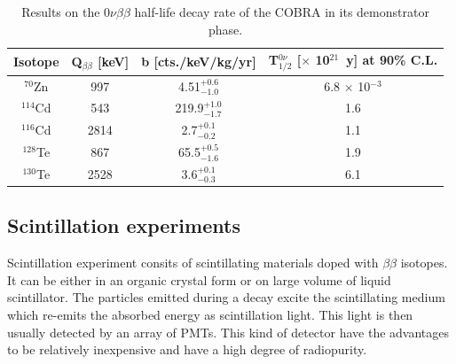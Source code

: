 \documentclass[main.tex]{subfiles}
\begin{document}
\begin{table}
\centering
\begin{tabular}{c|c|c|c}
\toprule
Isotope & Q$_{\beta\beta}$ [keV] & b [cts./keV/kg/yr] & T$_{\text{1/2}}^{0\nu}$ [$\times$ 10$^{\text{21}}$~y] at 90\% C.L. \\[0.1cm]
\hline
$^{\text{70}}$Zn  & 997  & 4.51$^{+\text{0.6}}_{-\text{1.0}}$  & 6.8 $\times$ 10$^{-\text{3}}$ \\[0.1cm]
$^{\text{114}}$Cd & 543  & 219.9$^{+\text{1.0}}_{-\text{1.7}}$ & 1.6 \\[0.1cm]
$^{\text{116}}$Cd & 2814 & 2.7$^{+\text{0.1}}_{-\text{0.2}}$   & 1.1 \\[0.1cm]
$^{\text{128}}$Te & 867  & 65.5$^{+\text{0.5}}_{-\text{1.6}}$  & 1.9 \\[0.1cm]
$^{\text{130}}$Te & 2528 & 3.6$^{+\text{0.1}}_{-\text{0.3}}$   & 6.1 \\[0.1cm]
\bottomrule
\end{tabular}
\caption{Results on the 0$\nu\beta\beta$ half-life decay rate of the COBRA in its demonstrator phase.}
\label{tab:CobraResultsDemonstrator}
\end{table}



\subsection{Scintillation experiments}


\NI Scintillation experiment consits of scintillating materials doped with $\beta\beta$ isotopes. It can be either in an organic crystal form or on large volume of liquid scintillator. The particles emitted during a decay excite the scintillating medium which re-emits the absorbed energy as scintillation light. This light is then usually detected by an array of PMTs. This kind of detector have the advantages to be relatively inexpensive and have a high degree of radiopurity. 


\bigskip


\end{document}
